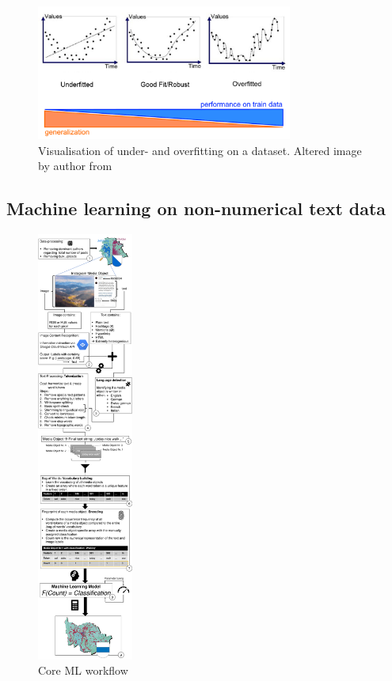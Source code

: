\begin{figure}[h]
   \centering
   \includegraphics[width=0.75\textwidth]{img/over_underfitting}
   \caption{Visualisation of under- and overfitting on a dataset. Altered image by author from\parencite{Bhande2018}}
   \label{fig:over_underfitting}
\end{figure}

\vspace{1cm}

\subsection{Machine learning on non-numerical text data} \label{ml_text_data}

\begin{figure} %
  \vspace{-0.5cm}
    \centerline{\includegraphics[trim={0 0 0 0},clip,width=0.28\textwidth]{img/ML_visualisation.pdf}}
  \caption{Core ML workflow}
  \label{fig:ml_visualisation}
\end{figure}

